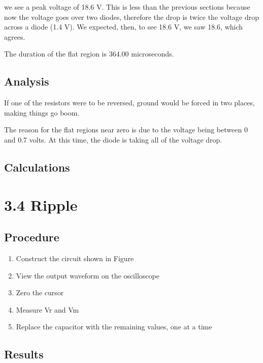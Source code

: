 \documentclass[12pt,letterpaper]{report}
\begin{document}
we see a peak voltage of 18.6 V. This is less than the previous sections because now the voltage goes over two diodes, therefore the drop is twice the voltage drop across a diode (1.4 V). We expected, then, to see 18.6 V, we saw 18.6, which agrees. 

The duration of the flat region is 364.00 microseconds.

\subsection*{Analysis}

If one of the resistors were to be reversed, ground would be forced in two places, making things go boom.

The reason for the flat regions near zero is due to the voltage being between 0 and 0.7 volts. At this time, the diode is taking all of the voltage drop. 

\subsection*{Calculations}

\section*{3.4 Ripple}
\subsection*{Procedure}

\begin{enumerate}
\item Construct the circuit shown in Figure %
\item View the output waveform on the oscilloscope
\item Zero the cursor
\item Measure Vr and Vm
\item Replace the capacitor with the remaining values, one at a time
\end{enumerate}

\subsection*{Results}
\end{document}
